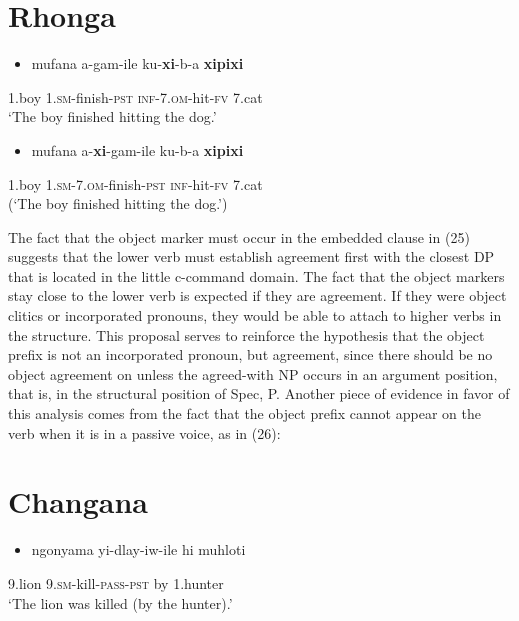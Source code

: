 \documentclass[output=paper]{langsci/langscibook}
\begin{document}
\chapter[Rhonga]{Rhonga}
\label{bkm:Ref455885488}\setcounter{itemize}{0}
\begin{itemize}
\item \gll mufana         a-gam-ile                ku-\textbf{xi}{}-b-a                   \textbf{xipixi}\\
\end{itemize}
     1.boy           1.\textsc{sm}{}-finish-\textsc{pst}        \textsc{inf}{}-7.\textsc{om}{}-hit-\textsc{fv}        7.cat\\
\glt ‘The boy finished hitting the dog.’
\z

\begin{itemize}
\item \gll *mufana       a-\textbf{xi}{}-gam-ile                      ku-b-a            \textbf{xipixi}\\
\end{itemize}
     1.boy           \textsc{1.sm-7.om}{}-finish-\textsc{pst}         \textsc{inf}{}-hit-\textsc{fv}      7.cat\\
\glt (‘The boy finished hitting the dog.’)
\z

The fact that the object marker must occur in the embedded clause in (25) suggests that the lower verb must establish agreement first with the closest DP that is located in the little  c-command domain. The fact that the object markers stay close to the lower verb is expected if they are agreement. If they were object clitics or incorporated pronouns, they would be able to attach to higher verbs in the structure. This proposal serves to reinforce the hypothesis that the object prefix is not an incorporated pronoun, but agreement, since there should be no object agreement on  unless the agreed-with NP occurs in an argument position, that is, in the structural position of  Spec, P. Another piece of evidence in favor of this analysis comes from the fact that the object prefix cannot appear on the verb when it is in a passive voice, as in (26):

\chapter[Changana]{Changana}
\label{bkm:Ref455885545}\setcounter{itemize}{0}
\begin{itemize}
\item \gll ngonyama            yi-dlay-iw-ile               hi      muhloti\\
\end{itemize}
     9.lion                   9.\textsc{sm}{}-kill-\textsc{pass}{}-\textsc{pst}       by     1.hunter\\
\glt ‘The lion was killed (by the hunter).’
\z
\end{document}
